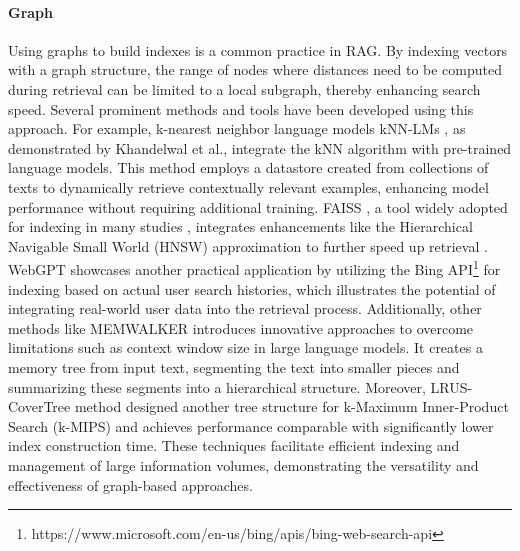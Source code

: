 \paragraph{Graph} Using graphs to build indexes is a common practice in RAG. By indexing vectors with a graph structure, the range of nodes where distances need to be computed during retrieval can be limited to a local subgraph, thereby enhancing search speed. Several prominent methods and tools have been developed using this approach. For example, k-nearest neighbor language models kNN-LMs \cite{khandelwal2020generalization}, as demonstrated by Khandelwal et al., integrate the kNN algorithm with pre-trained language models. This method employs a datastore created from collections of texts to dynamically retrieve contextually relevant examples, enhancing model performance without requiring additional training. FAISS \cite{8733051}, a tool widely adopted for indexing in many studies \cite{khandelwal2020generalization, lewis2020retrievalaugmented, khattab2022demonstratesearchpredict}, integrates enhancements like the Hierarchical Navigable Small World (HNSW) approximation \cite{8594636} to further speed up retrieval \cite{lewis2020retrievalaugmented}. WebGPT \cite{nakano2021webgpt} showcases another practical application by utilizing the Bing API\footnote{https://www.microsoft.com/en-us/bing/apis/bing-web-search-api} for indexing based on actual user search histories, which illustrates the potential of integrating real-world user data into the retrieval process. Additionally, other methods like MEMWALKER \cite{chen2023walking} introduces innovative approaches to overcome limitations such as context window size in large language models. It creates a memory tree from input text, segmenting the text into smaller pieces and summarizing these segments into a hierarchical structure. Moreover, LRUS-CoverTree method \cite{ma2024reconsidering} designed another tree structure for k-Maximum Inner-Product Search (k-MIPS) and achieves performance comparable with significantly lower index construction time. These techniques facilitate efficient indexing and management of large information volumes, demonstrating the versatility and effectiveness of graph-based approaches.

